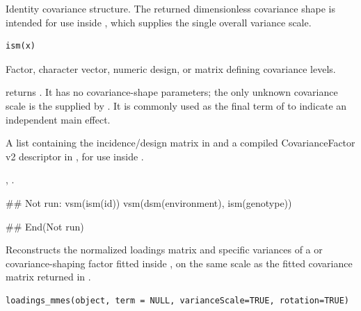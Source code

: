 \documentclass[a4paper]{book}
\begin{document}
%
\begin{Description}\relax
Identity covariance structure. The returned dimensionless covariance shape is intended for use inside , which supplies the single overall variance scale.
\end{Description}
%
\begin{Usage}
\begin{verbatim}
ism(x)
\end{verbatim}
\end{Usage}
%
\begin{Arguments}
\begin{ldescription}
\item[\code{x}] Factor, character vector, numeric design, or matrix defining covariance levels.
\end{ldescription}
\end{Arguments}
%
\begin{Details}\relax
{} returns .  It has no covariance-shape parameters; the only unknown covariance scale is the  supplied by .  It is commonly used as the final term of  to indicate an independent main effect.
\end{Details}
%
\begin{Value}
A list containing the incidence/design matrix in  and a compiled CovarianceFactor v2 descriptor in , for use inside .
\end{Value}
%
\begin{SeeAlso}\relax
{}, .
\end{SeeAlso}
%
\begin{Examples}
\begin{ExampleCode}
## Not run: 
vsm(ism(id))
vsm(dsm(environment), ism(genotype))

## End(Not run)
\end{ExampleCode}
\end{Examples}
%
\begin{Description}\relax
Reconstructs the normalized loadings matrix and specific variances of a
 or  covariance-shaping factor fitted inside
, on the same scale as the fitted covariance matrix returned in
.
\end{Description}
%
\begin{Usage}
\begin{verbatim}
loadings_mmes(object, term = NULL, varianceScale=TRUE, rotation=TRUE)
\end{verbatim}
\end{Usage}
\end{document}

